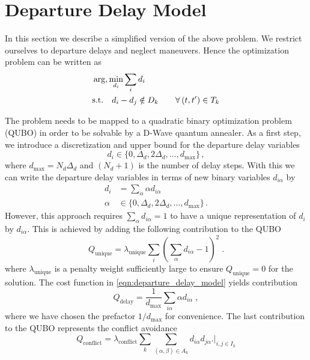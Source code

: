 \documentclass[aps,pra,twocolumn,10pt]{revtex4-1}
\begin{document}
\section{Departure Delay Model}
\label{sec:departure_delay_model}
In this section we describe a simplified version of the above problem.
We restrict ourselves to departure delays and neglect maneuvers.
Hence the optimization problem can be written as
\begin{align}
    & \arg, \min_{d_i} \sum_i d_i \notag \\
    & \text{s.t.}  \quad 
    d_i - d_j \notin D_k \qquad \forall \, (t, t') \in T_k \label{eqn:departure_delay_model}
\end{align}

The problem needs to be mapped to a quadratic binary optimization problem (QUBO) in order to be solvable by a D-Wave quantum annealer.
As a first step, we introduce a discretization and upper bound for the departure delay variables 
\begin{equation*}
    d_i \in \{0, \Delta_d, 2\Delta_d, \dots, d_\text{max} \}\, ,
\end{equation*}
where $d_\text{max} = N_d \Delta_d$ and $(N_d + 1)$ is the number of delay steps.
With this we can write the departure delay variables in terms of new binary variables $d_{i\alpha}$ by
\begin{align*}
    d_i & = \sum_\alpha \alpha d_{i\alpha} \\
    \alpha & \in \{0, \Delta_d, 2\Delta_d, \dots, d_\text{max} \}\, .
\end{align*}
However, this approach requires $\sum_\alpha d_{i\alpha} = 1$ to have a unique representation of $d_i$ by $d_{i\alpha}$.
This is achieved by adding the following contribution to the QUBO
\begin{equation*}
    Q_\text{unique} = \lambda_\text{unique} \sum_i \left( \sum_\alpha d_{i\alpha} - 1 \right)^2 \; .
\end{equation*}
where $\lambda_\text{unique}$ is a penalty weight sufficiently large to ensure $Q_\text{unique}=0$ for the solution.
The cost function in \eqref{eqn:departure_delay_model} yields contribution
\begin{equation*}
    Q_\text{delay} = \frac{1}{d_\text{max}}\sum_{i\alpha} \alpha d_{i\alpha} \; ,
\end{equation*}
where we have chosen the prefactor $1/d_\text{max}$ for convenience.
The last contribution to the QUBO represents the conflict avoidance
\begin{equation*}
    Q_\text{conflict} = \lambda_\text{conflict} \sum_k \sum_{(\alpha, \beta) \in A_k} d_{i\alpha} d_{j\alpha} \biggl. \biggr|_{i, j \in I_k}
\end{equation*}
\end{document}
